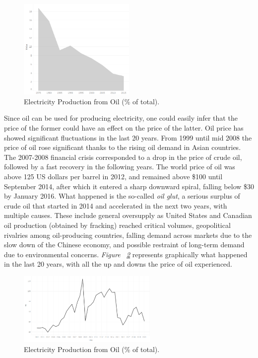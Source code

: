 \documentclass[a4paper,12pt]{book}
\begin{document}
\begin{figure}[tb]
\begin{center}
\captionsetup{justification=centering}
\includegraphics[width=0.5\textwidth]{Images/oil.png}
\caption{Electricity Production from Oil (\% of total).}
\label{fig:oil}
\end{center}
\end{figure}

Since oil can be used for producing electricity, one could easily infer that the price of the former could have an effect on the price of the latter. Oil price has showed significant fluctuations in the last 20 years. From 1999 until mid 2008 the price of oil rose significant thanks to the rising oil demand in Asian countries. The 2007-2008 financial crisis corresponded to a drop in the price of crude oil, followed by a fast recovery in the following years. The world price of oil was above 125 US dollars per barrel in 2012, and remained above \$100 until September 2014, after which it entered a sharp downward spiral, falling below \$30 by January 2016. What happened is the so-called \textit{oil glut}, a serious surplus of crude oil that started in 2014 and accelerated in the next two years, with multiple causes. These include general oversupply as United States and Canadian oil production (obtained by fracking) reached critical volumes, geopolitical rivalries among oil-producing countries, falling demand across markets due to the slow down of the Chinese economy, and possible restraint of long-term demand due to environmental concerns. \textit{Figure ~\ref{fig:oilbeh}} represents graphically what happened in the last 20 years, with all the up and downs the price of oil experienced.

\begin{figure}[tb]
\begin{center}
\captionsetup{justification=centering}
\includegraphics[width=0.6\textwidth]{Images/oilbeh.png}
\caption{Electricity Production from Oil (\% of total). }
\label{fig:oilbeh}
\end{center}
\end{figure}
\end{document}
